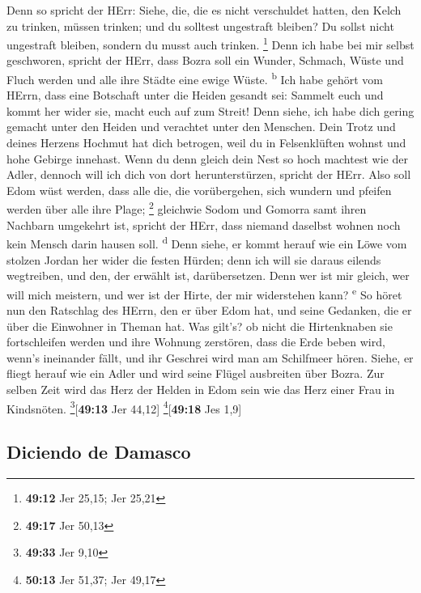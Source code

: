  Denn so spricht der HErr: Siehe, die, die es nicht
verschuldet hatten, den Kelch zu trinken, müssen trinken; und du
solltest ungestraft bleiben? Du sollst nicht ungestraft bleiben, sondern
du musst auch trinken. \footnote{\textbf{49:12} Jer 25,15; Jer 25,21}
 Denn ich habe bei mir selbst geschworen, spricht der
HErr, dass Bozra soll ein Wunder, Schmach, Wüste und Fluch werden und
alle ihre Städte eine ewige Wüste. \textsuperscript{b} 
Ich habe gehört vom HErrn, dass eine Botschaft unter die Heiden gesandt
sei: Sammelt euch und kommt her wider sie, macht euch auf zum Streit!
 Denn siehe, ich habe dich gering gemacht unter den
Heiden und verachtet unter den Menschen.  Dein Trotz und
deines Herzens Hochmut hat dich betrogen, weil du in Felsenklüften
wohnst und hohe Gebirge innehast. Wenn du denn gleich dein Nest so hoch
machtest wie der Adler, dennoch will ich dich von dort herunterstürzen,
spricht der HErr.  Also soll Edom wüst werden, dass alle
die, die vorübergehen, sich wundern und pfeifen werden über alle ihre
Plage; \footnote{\textbf{49:17} Jer 50,13}  gleichwie
Sodom und Gomorra samt ihren Nachbarn umgekehrt ist, spricht der HErr,
dass niemand daselbst wohnen noch kein Mensch darin hausen soll.
\textsuperscript{d}  Denn siehe, er kommt herauf wie ein
Löwe vom stolzen Jordan her wider die festen Hürden; denn ich will sie
daraus eilends wegtreiben, und den, der erwählt ist, darübersetzen. Denn
wer ist mir gleich, wer will mich meistern, und wer ist der Hirte, der
mir widerstehen kann? \textsuperscript{e}  So höret nun
den Ratschlag des HErrn, den er über Edom hat, und seine Gedanken, die
er über die Einwohner in Theman hat. Was gilt's? ob nicht die
Hirtenknaben sie fortschleifen werden und ihre Wohnung zerstören,
 dass die Erde beben wird, wenn's ineinander fällt, und
ihr Geschrei wird man am Schilfmeer hören.  Siehe, er
fliegt herauf wie ein Adler und wird seine Flügel ausbreiten über Bozra.
Zur selben Zeit wird das Herz der Helden in Edom sein wie das Herz einer
Frau in Kindsnöten. \footnote{\textbf{49:33} Jer 9,10}{[}\textbf{49:13}
Jer 44,12{]} \footnote{\textbf{50:13} Jer 51,37; Jer 49,17}{[}\textbf{49:18}
Jes 1,9{]}

\hypertarget{diciendo-de-damasco}{%
\subsection{Diciendo de Damasco}\label{diciendo-de-damasco}}


